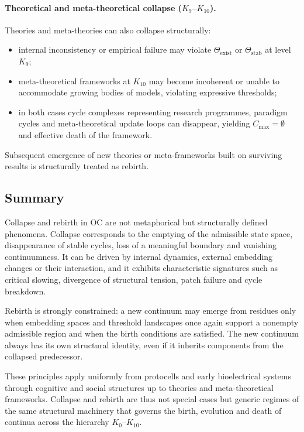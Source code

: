 \paragraph{Theoretical and meta-theoretical collapse (\texorpdfstring{\(K_9\)}{K_9}–\(K_{10}\)).}
Theories and meta-theories can also collapse structurally:
\begin{itemize}
  \item internal inconsistency or empirical failure may violate
        \(\Theta_{\mathrm{exist}}\) or \(\Theta_{\mathrm{stab}}\) at level
        \(K_9\);
  \item meta-theoretical frameworks at \(K_{10}\) may become incoherent or
        unable to accommodate growing bodies of models, violating expressive
        thresholds;
  \item in both cases cycle complexes representing research programmes,
        paradigm cycles and meta-theoretical update loops can disappear,
        yielding \(C_{\max}=\emptyset\) and effective death of the framework.
\end{itemize}
Subsequent emergence of new theories or meta-frameworks built on surviving
results is structurally treated as rebirth.

\subsection{Summary}

Collapse and rebirth in OC are not metaphorical but structurally defined
phenomena. Collapse corresponds to the emptying of the admissible state
space, disappearance of stable cycles, loss of a meaningful boundary and
vanishing continuumness. It can be driven by internal dynamics, external
embedding changes or their interaction, and it exhibits characteristic
signatures such as critical slowing, divergence of structural tension, patch
failure and cycle breakdown.

Rebirth is strongly constrained: a new continuum may emerge from residues only
when embedding spaces and threshold landscapes once again support a nonempty
admissible region and when the birth conditions are satisfied. The new
continuum always has its own structural identity, even if it inherits
components from the collapsed predecessor.

These principles apply uniformly from protocells and early bioelectrical
systems through cognitive and social structures up to theories and
meta-theoretical frameworks. Collapse and rebirth are thus not special
cases but generic regimes of the same structural machinery that governs the
birth, evolution and death of continua across the hierarchy \(K_0\)–\(K_{10}\).

